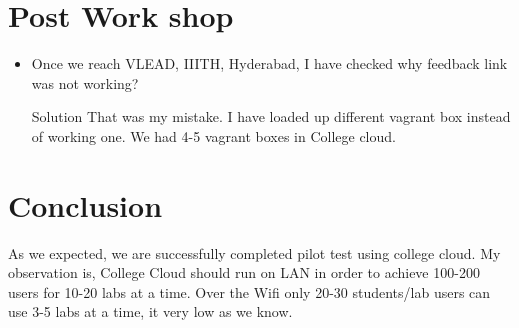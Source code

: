 \documentclass[11pt]{article}
\begin{document}
\section{Post Work shop}
\label{sec-5}
\begin{itemize}
\item Once we reach VLEAD, IIITH, Hyderabad, I have checked why feedback
link was not working?
\item[{Solution}] That was my mistake. I have loaded up different
vagrant box instead of working one. We had 4-5 vagrant
boxes in College cloud.
\end{itemize}

\section{Conclusion}
\label{sec-6}
As we expected, we are successfully completed pilot test using
college cloud.  My observation is, College Cloud should run on LAN
in order to achieve 100-200 users for 10-20 labs at a time. Over the
Wifi only 20-30 students/lab users can use 3-5 labs at a time, it
very low as we know.
\end{document}

